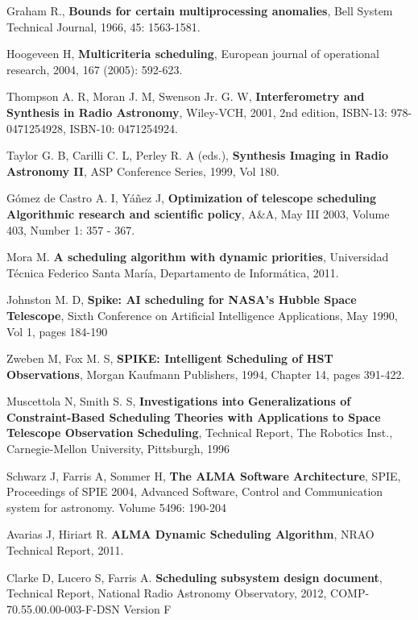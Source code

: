 \documentclass[11pt]{article}
\begin{document}
\begin{thebibliography}{9}
	Graham R.,
	\textbf{Bounds for certain multiprocessing anomalies},
	Bell System Technical Journal,
	1966,
	45: 1563-1581.

	Hoogeveen H,
	\textbf{Multicriteria scheduling},
	European journal of operational research,
	2004,
	167 (2005): 592-623.
	
	Thompson A. R, Moran J. M, Swenson Jr. G. W, 
	\textbf{Interferometry and Synthesis in Radio Astronomy},
	Wiley-VCH,
	2001,
	2nd edition,
	ISBN-13: 978-0471254928, ISBN-10: 0471254924.
	
	Taylor G. B, Carilli C. L, Perley R. A (eds.),
	\textbf{Synthesis Imaging in Radio Astronomy II},
	ASP Conference Series,
	1999,
	Vol 180.
	
	G\'omez de Castro A. I, Y\'a\~nez J,
	\textbf{Optimization of telescope scheduling Algorithmic research and scientific policy},
	 A\&A,
	 May III 2003,
	 Volume 403, Number 1: 357 - 367.
	 
	Mora M.
	\textbf{A scheduling algorithm with dynamic priorities},
	Universidad T\'ecnica Federico Santa Mar\'ia, Departamento de Inform\'atica,
	2011.

	Johnston M. D,
	\textbf{Spike: AI scheduling for NASA's Hubble Space Telescope},
	Sixth Conference on Artificial Intelligence  Applications,
	May 1990,
	Vol 1, pages 184-190
	
	Zweben M, Fox M. S,
	\textbf{SPIKE: Intelligent Scheduling of HST Observations},
	Morgan Kaufmann Publishers,
	1994,
	Chapter 14, pages 391-422.

	Muscettola N, Smith S. S,
	\textbf{Investigations into Generalizations of 				Constraint-Based Scheduling Theories with Applications to Space Telescope Observation Scheduling},
	Technical Report,
	The Robotics Inst., Carnegie-Mellon University,
	Pittsburgh, 1996

	Schwarz J, Farris A, Sommer H,
	\textbf{The ALMA Software Architecture},
	SPIE,
	Proceedings of SPIE 2004, Advanced Software, Control and Communication system for astronomy.
	Volume 5496: 190-204

	Avarias J, Hiriart R.
	\textbf{ALMA Dynamic Scheduling Algorithm},
	NRAO Technical Report,
	2011.

	Clarke D, Lucero S, Farris A.
	\textbf{Scheduling subsystem design document},
	Technical Report,
	National Radio Astronomy Observatory,
	2012,
	COMP-70.55.00.00-003-F-DSN Version F
	

	
	
\end{thebibliography}
\end{document}
